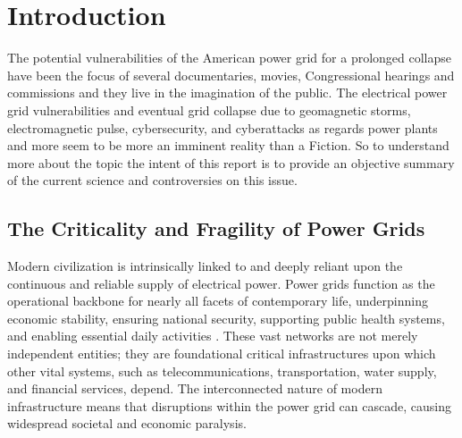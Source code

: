 \documentclass[10pt,twocolumn,letterpaper]{article}
\begin{document}


\section{Introduction}
\label{sec:intro}

The potential vulnerabilities of the American power grid for a prolonged collapse have been the focus of several documentaries, movies, Congressional hearings and commissions and they live in the imagination of the public. The electrical power grid vulnerabilities and eventual grid collapse due to geomagnetic storms, electromagnetic pulse, cybersecurity, and cyberattacks as regards power plants and more seem to be more an imminent reality than a Fiction. So to understand more about the topic the intent of this report is to provide an objective summary of the current science and controversies on this issue.

\subsection{The Criticality and Fragility of Power Grids}

Modern civilization is intrinsically linked to and deeply reliant upon the continuous and reliable supply of electrical power. Power grids function as the operational backbone for nearly all facets of contemporary life, underpinning economic stability, ensuring national security, supporting public health systems, and enabling essential daily activities \cite{number1}. 
These vast networks are not merely independent entities; they are foundational critical infrastructures upon which other vital systems, such as telecommunications, transportation, water supply, and financial services, depend. \cite{ani2019review} 
The interconnected nature of modern infrastructure means that disruptions within the power grid can cascade, causing widespread societal and economic paralysis.
\end{document}
